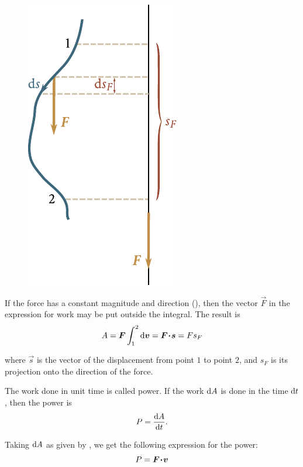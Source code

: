 \begin{figure}[t]
	\begin{center}
		\includegraphics[scale=0.95]{figures/ch_03/fig_3_3.pdf}
		\caption[]{}
		\label{fig:3_3}
	\end{center}
	\vspace{-0.7cm}
\end{figure}

If the force has a constant magnitude and direction (), then the vector $\vec{F}$ in the expression for work may be put outside the integral. The result is
\begin{equation}\label{eq:3_19}
A = \boldsymbol{F}\int_{1}^{2}\mathrm{d}\boldsymbol{v} = \boldsymbol{F\!\cdot\!s} = F s_F
\end{equation}

\noindent
where $\vec{s}$ is the vector of the displacement from point $1$ to point $2$, and $s_F$ is its projection onto the direction of the force.

The work done in unit time is called power. If the work $\mathrm{d} A$ is done in the time $\mathrm{d} t$, then the power is
\begin{equation}\label{eq:3_20}
P = \frac{\mathrm{d} A}{\mathrm{d} t}.
\end{equation}

\noindent
Taking $\mathrm{d} A$ as given by , we get the following expression for the power:
\begin{equation}\label{eq:3_21}
P = \boldsymbol{F\!\cdot\!v}
\end{equation}

